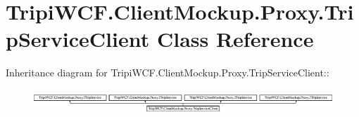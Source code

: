 \hypertarget{class_tripi_w_c_f_1_1_client_mockup_1_1_proxy_1_1_trip_service_client}{
\section{TripiWCF.ClientMockup.Proxy.TripServiceClient Class Reference}
\label{class_tripi_w_c_f_1_1_client_mockup_1_1_proxy_1_1_trip_service_client}
}
Inheritance diagram for TripiWCF.ClientMockup.Proxy.TripServiceClient::\begin{figure}[H]
\begin{center}
\leavevmode
\includegraphics[height=0.955631cm]{class_tripi_w_c_f_1_1_client_mockup_1_1_proxy_1_1_trip_service_client}
\end{center}
\end{figure}

